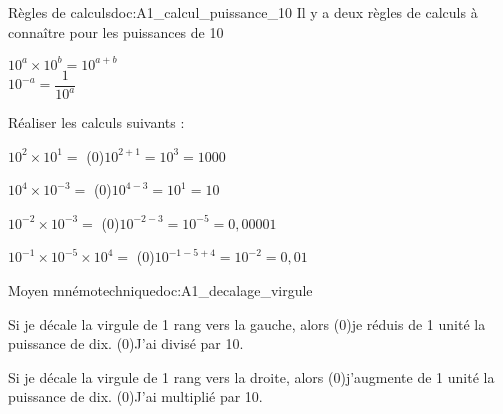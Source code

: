 \pasCorrection{\vspace*{-18pt}}
\begin{doc}{Règles de calculs}{doc:A1_calcul_puissance_10}
  Il y a deux règles de calculs à connaître pour les puissances de 10
  \begin{importants}
    \pointCyan $10^a \times 10^b = 10^{a + b}$ \\   
    \pointCyan $10^{-a} = \dfrac{1}{10^a}$
  \end{importants}
\end{doc}


\numeroQuestion Réaliser les calculs suivants :
\pasCorrection{\vspace*{-4pt}}
\begin{listePoints}[2]
  \setlength\itemsep{-4pt}
  \item $10^2 \times 10^1 =$ \texteTrou(0){$10^{2 + 1} = 10^3 = 1000$}
  \item $10^4 \times 10^{-3} =$ \texteTrou(0){$10^{4 - 3} = 10^1 = 10$}
  \item $10^{-2} \times 10^{-3} =$ \texteTrou(0){$10^{-2 - 3} = 10^{-5} = 0,00001$}
  \item $10^{-1} \times 10^{-5} \times 10^4 =$ \texteTrou(0){$10^{-1 - 5 + 4} = 10^{-2} = 0,01$}
\end{listePoints}


\pasCorrection{\vspace*{-18pt}}
\begin{doc}{Moyen mnémotechnique}{doc:A1_decalage_virgule}
  \begin{listePoints}
    \setlength\itemsep{-4pt}
    \item Si je décale la virgule de 1 rang vers la gauche, alors
    \texteTrou(0){je réduis} de 1 unité la puissance de dix. \texteTrou(0){J'ai divisé par 10.}
    \item Si je décale la virgule de 1 rang vers la droite, alors
    \texteTrou(0){j'augmente} de 1 unité la puissance de dix. \texteTrou(0){J'ai multiplié par 10.}
  \end{listePoints}
\end{doc}


\newpage
\vspace*{-36pt}

